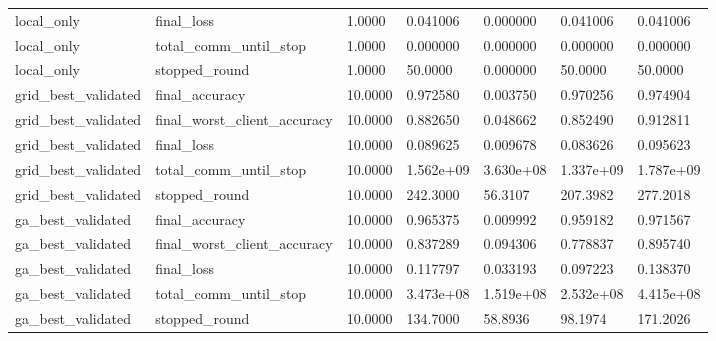 \documentclass[11pt]{report}
\begin{document}
\begin{longtable}{lllllll}
local\_only & final\_loss & 1.0000 & 0.041006 & 0.000000 & 0.041006 & 0.041006 \\
local\_only & total\_comm\_until\_stop & 1.0000 & 0.000000 & 0.000000 & 0.000000 & 0.000000 \\
local\_only & stopped\_round & 1.0000 & 50.0000 & 0.000000 & 50.0000 & 50.0000 \\
grid\_best\_validated & final\_accuracy & 10.0000 & 0.972580 & 0.003750 & 0.970256 & 0.974904 \\
grid\_best\_validated & final\_worst\_client\_accuracy & 10.0000 & 0.882650 & 0.048662 & 0.852490 & 0.912811 \\
grid\_best\_validated & final\_loss & 10.0000 & 0.089625 & 0.009678 & 0.083626 & 0.095623 \\
grid\_best\_validated & total\_comm\_until\_stop & 10.0000 & 1.562e+09 & 3.630e+08 & 1.337e+09 & 1.787e+09 \\
grid\_best\_validated & stopped\_round & 10.0000 & 242.3000 & 56.3107 & 207.3982 & 277.2018 \\
ga\_best\_validated & final\_accuracy & 10.0000 & 0.965375 & 0.009992 & 0.959182 & 0.971567 \\
ga\_best\_validated & final\_worst\_client\_accuracy & 10.0000 & 0.837289 & 0.094306 & 0.778837 & 0.895740 \\
ga\_best\_validated & final\_loss & 10.0000 & 0.117797 & 0.033193 & 0.097223 & 0.138370 \\
ga\_best\_validated & total\_comm\_until\_stop & 10.0000 & 3.473e+08 & 1.519e+08 & 2.532e+08 & 4.415e+08 \\
ga\_best\_validated & stopped\_round & 10.0000 & 134.7000 & 58.8936 & 98.1974 & 171.2026 \\
\bottomrule
\end{longtable}
\end{document}
